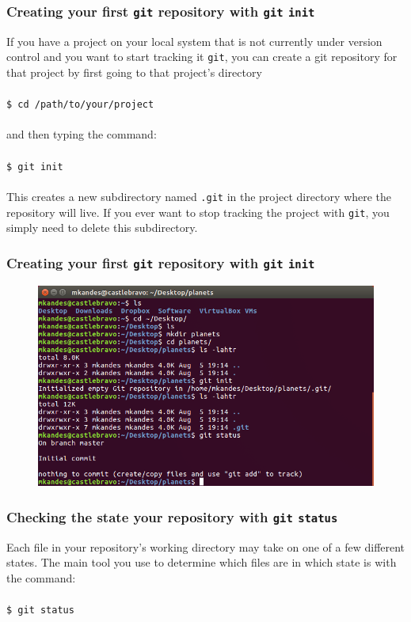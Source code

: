 \documentclass{beamer}
\begin{document}
\begin{frame}
   \frametitle{Creating your first \texttt{git} repository with \texttt{git} \texttt{init}}
   If you have a project on your local system that is not currently
   under version control and you want to start tracking it \texttt{git},
   you can create a git repository for that project by first going to
   that project's directory
   \\ \ \\
   \texttt{\hspace{1.0em}\$ cd /path/to/your/project}
   \\ \ \\
   and then typing the command:
   \\ \ \\
   \texttt{\hspace{1.0em}\$ git init}
   \\ \ \\
   This creates a new subdirectory named \texttt{.git} in the project 
   directory where the repository will live. If you ever want to stop 
   tracking the project with \texttt{git}, you simply need to delete 
   this subdirectory.
\end{frame}

\begin{frame}
   \frametitle{Creating your first \texttt{git} repository with \texttt{git} \texttt{init}}
   \begin{figure}[htbp]
      \includegraphics[width=1.0\textwidth]{images/git-init.png}
   \end{figure}
\end{frame}

\begin{frame}
   \frametitle{Checking the state your repository with \texttt{git} \texttt{status}}
   Each file in your repository's working directory may take on one of 
   a few different states. The main tool you use to determine which files
   are in which state is with the command:
   \\ \ \\
   \texttt{\hspace{1.0em}\$ git status}
\end{frame}
\end{document}
